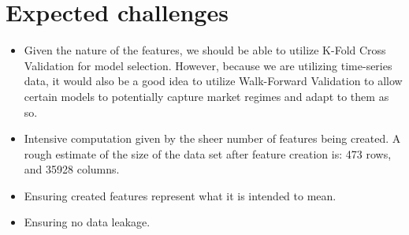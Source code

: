 \documentclass[11pt]{article}
\begin{document}
\newpage

\section{Expected challenges}

\begin{itemize}
    \item Given the nature of the features, we should be able to utilize K-Fold Cross Validation for model selection. However, because we are utilizing time-series data, it would also be a good idea to utilize Walk-Forward Validation to allow certain models to potentially capture market regimes and adapt to them as so.
    \item Intensive computation given by the sheer number of features being created. A rough estimate of the size of the data set after feature creation is: 473 rows, and 35928 columns. 
    \item Ensuring created features represent what it is intended to mean.
    \item Ensuring no data leakage.
\end{itemize}
\end{document}
